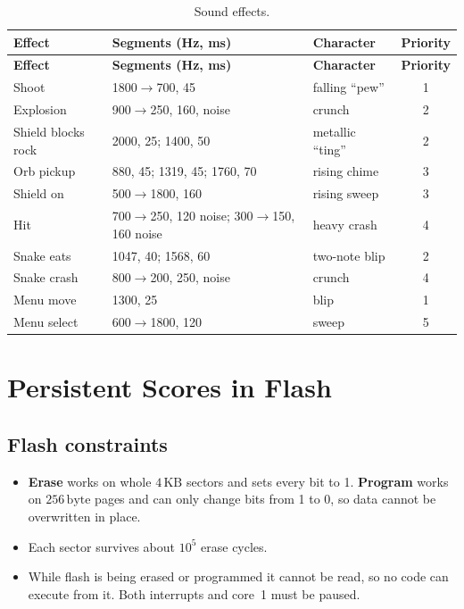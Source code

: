 \documentclass[11pt,a4paper]{article}
\newcommand{\unit}[2]{\ensuremath{#1\,\mathrm{#2}}}
\begin{document}
\begin{longtable}{lllc}
\caption{Sound effects.}\label{tab:sfx}\\
\toprule
\textbf{Effect} & \textbf{Segments (Hz, ms)} & \textbf{Character} & \textbf{Priority} \\
\midrule\endfirsthead
\toprule
\textbf{Effect} & \textbf{Segments (Hz, ms)} & \textbf{Character} & \textbf{Priority} \\
\midrule\endhead
Shoot & 1800$\to$700, 45 & falling ``pew'' & 1 \\
Explosion & 900$\to$250, 160, noise & crunch & 2 \\
Shield blocks rock & 2000, 25; 1400, 50 & metallic ``ting'' & 2 \\
Orb pickup & 880, 45; 1319, 45; 1760, 70 & rising chime & 3 \\
Shield on & 500$\to$1800, 160 & rising sweep & 3 \\
Hit & 700$\to$250, 120 noise; 300$\to$150, 160 noise & heavy crash & 4 \\
Snake eats & 1047, 40; 1568, 60 & two-note blip & 2 \\
Snake crash & 800$\to$200, 250, noise & crunch & 4 \\
Menu move & 1300, 25 & blip & 1 \\
Menu select & 600$\to$1800, 120 & sweep & 5 \\
\bottomrule
\end{longtable}

\section{Persistent Scores in Flash}\label{sec:save}

\subsection{Flash constraints}
\begin{itemize}
  \item \textbf{Erase} works on whole \unit{4}{KB} sectors and sets every bit
        to 1. \textbf{Program} works on \unit{256}{byte} pages and can only change
        bits from 1 to 0, so data cannot be overwritten in place.
  \item Each sector survives about $10^5$ erase cycles.
  \item While flash is being erased or programmed it cannot be read, so no code
        can execute from it. Both interrupts and core~1 must be paused.
\end{itemize}
\end{document}
